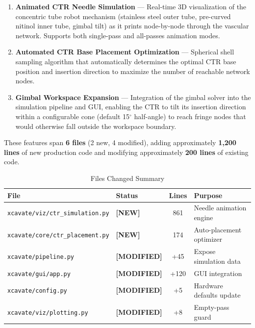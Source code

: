 \documentclass[11pt,a4paper]{article}
\newcommand{\filename}[1]{\texttt{\textcolor{accentblue}{#1}}}
\newcommand{\newlabel}{\textcolor{newfile}{\textbf{[NEW]}}}
\newcommand{\modlabel}{\textcolor{modifiedfile}{\textbf{[MODIFIED]}}}
\begin{document}
\begin{enumerate}[label=\textbf{\arabic*.}]
    \item \textbf{Animated CTR Needle Simulation} --- Real-time 3D visualization of the concentric tube robot mechanism (stainless steel outer tube, pre-curved nitinol inner tube, gimbal tilt) as it prints node-by-node through the vascular network. Supports both single-pass and all-passes animation modes.

    \item \textbf{Automated CTR Base Placement Optimization} --- Spherical shell sampling algorithm that automatically determines the optimal CTR base position and insertion direction to maximize the number of reachable network nodes.

    \item \textbf{Gimbal Workspace Expansion} --- Integration of the gimbal solver into the simulation pipeline and GUI, enabling the CTR to tilt its insertion direction within a configurable cone (default 15$^\circ$ half-angle) to reach fringe nodes that would otherwise fall outside the workspace boundary.
\end{enumerate}

\noindent These features span \textbf{6 files} (2 new, 4 modified), adding approximately \textbf{1,200 lines} of new production code and modifying approximately \textbf{200 lines} of existing code.

\begin{table}[H]
\centering
\caption{Files Changed Summary}
\begin{tabular}{llcl}
\toprule
\textbf{File} & \textbf{Status} & \textbf{Lines} & \textbf{Purpose} \\
\midrule
\filename{xcavate/viz/ctr\_simulation.py} & \newlabel & 861 & Needle animation engine \\
\filename{xcavate/core/ctr\_placement.py} & \newlabel & 174 & Auto-placement optimizer \\
\filename{xcavate/pipeline.py} & \modlabel & +45 & Expose simulation data \\
\filename{xcavate/gui/app.py} & \modlabel & +120 & GUI integration \\
\filename{xcavate/config.py} & \modlabel & +5 & Hardware defaults update \\
\filename{xcavate/viz/plotting.py} & \modlabel & +8 & Empty-pass guard \\
\bottomrule
\end{tabular}
\end{table}
\end{document}
